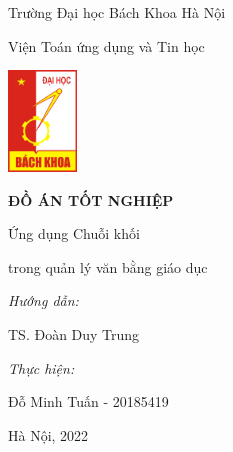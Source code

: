 \begin{titlepage}
    \centering
    \vspace{0.25cm}
    {\large Trường Đại học Bách Khoa Hà Nội\par}
    \vspace{0.25cm}
    {\normalsize Viện Toán ứng dụng và Tin học\par}
    \vspace{0.75cm}
    {\includegraphics[width=69px]{images/hust-logo.png}\par}
    \vspace{1cm}
    {\Large\textbf{ĐỒ ÁN TỐT NGHIỆP}\par}
    \vspace{1.5cm}
    {\large Ứng dụng Chuỗi khối\par}
    \vspace{0.25cm}
    {\large trong quản lý văn bằng giáo dục\par}
    \vspace{1.25cm}
    \begin{flushleft}
        \hspace{3cm}
        {\normalsize\textit{Hướng dẫn:}\par}
        \vspace{0.125cm}
        \hspace{5cm}
        {\normalsize TS. Đoàn Duy Trung\par}
        \vspace{0.125cm}
        \hspace{3cm}
        {\normalsize\textit{Thực hiện:}\par}
        \vspace{0.125cm}
        \hspace{5cm}
        {\normalsize Đỗ Minh Tuấn - 20185419\par}
    \end{flushleft}
    \vspace{3cm}
    {\normalsize Hà Nội, 2022\par}
    \vspace{0.5cm}
\end{titlepage}